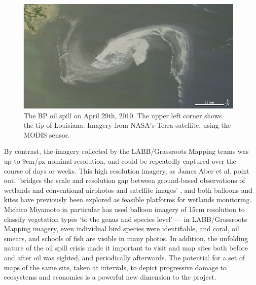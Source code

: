 \documentclass[11pt,oneside,notitlepage]{report}
\begin{document}
\begin{figure}[h]
  \begin{center}
	\includegraphics[width=1\textwidth]{images/nasa-modis-small.jpg}
	\caption{The BP oil spill on April 29th, 2010. The upper left corner shows the tip of Louisiana. Imagery from NASA's Terra satellite, using the MODIS sensor.}
  \end{center}
\end{figure}

By contrast, the imagery collected by the LABB/Grassroots Mapping teams was up to 9cm/px nominal resolution, and could be repeatedly captured over the course of days or weeks. This high resolution imagery, as James Aber et al. point out, `bridges the scale and resolution gap between ground-based observations of wetlands and conventional airphotos and satellite images' \cite{aber2002unmanned}, and both balloons and kites have previously been explored as feasible platforms for wetlands monitoring. \cite{aber2002unmanned}\cite{miyamoto2004use} Michiro Miyamoto in particular has used balloon imagery of 15cm resolution to classify vegetation types `to the genus and species level' \cite{miyamoto2004use} --- in \ac{LABB}/Grassroots Mapping imagery, even individual bird species were identifiable, and coral, oil smears, and schools of fish are visible in many photos. In addition, the unfolding nature of the oil spill crisis made it important to visit and map sites both before and after oil was sighted, and periodically afterwards. The potential for a set of maps of the same site, taken at intervals, to depict progressive damage to ecosystems and economies is a powerful new dimension to the project.  
\end{document}
